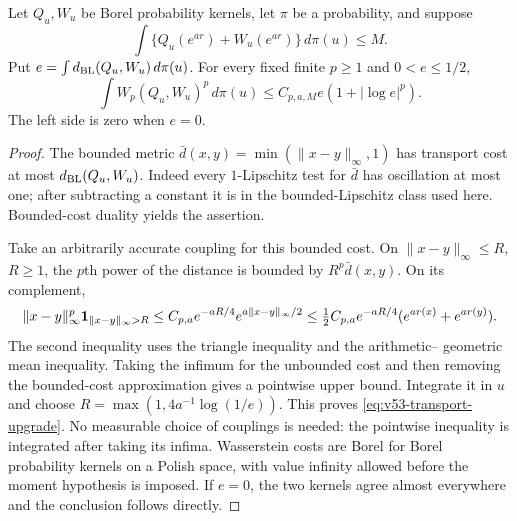 \begin{lemma}
\label{lem:v53-transport-upgrade}
Let $Q_u,W_u$ be Borel probability kernels, let $\pi$ be a probability,
and suppose
\[
 \int\{Q_u(e^{ar})+W_u(e^{ar})\}\,d\pi(u)\le M.
\]
Put $e=\int d_{\rm BL}(Q_u,W_u)\,d\pi(u)$. For every fixed finite
$p\ge1$ and $0<e\le1/2$,
\begin{equation}\label{eq:v53-transport-upgrade}
 \int W_p(Q_u,W_u)^p\,d\pi(u)
                         \le C_{p,a,M}e(1+|\log e|^p).
\end{equation}
The left side is zero when $e=0$.
\end{lemma}
\begin{proof}
The bounded metric $\bar d(x,y)=\min(\|x-y\|_\infty,1)$ has
transport cost at most $d_{\rm BL}(Q_u,W_u)$. Indeed every
$1$-Lipschitz test for $\bar d$ has oscillation at most one; after
subtracting a constant it is in the bounded-Lipschitz class used here.
Bounded-cost duality yields the assertion.

Take an arbitrarily accurate coupling for this bounded cost. On
$\|x-y\|_\infty\le R$, $R\ge1$, the $p$th power of the distance
is bounded by $R^p\bar d(x,y)$. On its complement,
\[
 \|x-y\|_\infty^p\mathbf1_{\|x-y\|_\infty>R}
 \le C_{p,a}e^{-aR/4}e^{a\|x-y\|_\infty/2}
 \le \tfrac12C_{p,a}e^{-aR/4}(e^{ar(x)}+e^{ar(y)}).
\]
The second inequality uses the triangle inequality and the arithmetic--
geometric mean inequality. Taking the infimum for the unbounded cost
and then removing the bounded-cost approximation gives a pointwise
upper bound. Integrate it in $u$ and choose
$R=\max(1,4a^{-1}\log(1/e))$. This proves
\eqref{eq:v53-transport-upgrade}. No measurable choice of couplings
is needed: the pointwise inequality is integrated after taking its
infima. Wasserstein costs are Borel for Borel probability kernels
on a Polish space, with value infinity allowed before the moment
hypothesis is imposed. If $e=0$, the two kernels agree almost
everywhere and the conclusion follows directly.
\end{proof}

